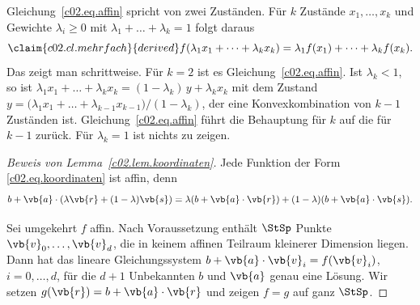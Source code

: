 \begin{vertiefung}[id=c02.v1,
    titel={Warum affine Funktionen diese Form haben},
    wozu={Der Kern benutzt Lemma~\ref{c02.lem.koordinaten} ohne Beweis. Hier steht er,
      zusammen mit der Regel für Mischungen aus mehr als zwei Zuständen.},
    voraussetzung={Kern bis Lemma~\ref{c02.lem.koordinaten}; lineare Gleichungssysteme.
      Der Rest des Kerns braucht diesen Block nicht.},
    zurueck={Auf einem Zustandsraum im $\mathbb{R}^d$ ist ein Effekt durch $d+1$ Zahlen
      festgelegt: $b$ und die Komponenten von $\vb{a}$.}]
  Gleichung~\eqref{c02.eq.affin} spricht von zwei Zuständen. Für $k$ Zustände
  $x_1, \dots, x_k$ und Gewichte $\lambda_i \geq 0$ mit $\lambda_1 + \dots + \lambda_k = 1$
  folgt daraus
  \begin{equation}\label{c02.eq.mehrfach}\claim{c02.cl.mehrfach}{derived}
    f(\lambda_1 x_1 + \dots + \lambda_k x_k) = \lambda_1 f(x_1) + \dots + \lambda_k f(x_k) .
  \end{equation}
  Das zeigt man schrittweise. Für $k = 2$ ist es Gleichung~\eqref{c02.eq.affin}. Ist
  $\lambda_k < 1$, so ist
  $\lambda_1 x_1 + \dots + \lambda_k x_k = (1-\lambda_k)\, y + \lambda_k x_k$ mit dem Zustand
  $y = \bigl(\lambda_1 x_1 + \dots + \lambda_{k-1} x_{k-1}\bigr)/(1-\lambda_k)$, der eine
  Konvexkombination von $k-1$ Zuständen ist. Gleichung~\eqref{c02.eq.affin} führt die
  Behauptung für $k$ auf die für $k-1$ zurück. Für $\lambda_k = 1$ ist nichts zu zeigen.

  \begin{proof}[Beweis von Lemma~\ref{c02.lem.koordinaten}]
    Jede Funktion der Form \eqref{c02.eq.koordinaten} ist affin, denn
    \begin{equation*}
      b + \vb{a}\cdot(\lambda\vb{r} + (1-\lambda)\vb{s})
      = \lambda(b + \vb{a}\cdot\vb{r}) + (1-\lambda)(b + \vb{a}\cdot\vb{s}) .
    \end{equation*}

    Sei umgekehrt $f$ affin. Nach Voraussetzung enthält $\StSp$ Punkte
    $\vb{v}_0, \dots, \vb{v}_d$, die in keinem affinen Teilraum kleinerer Dimension liegen.
    Dann hat das lineare Gleichungssystem $b + \vb{a}\cdot\vb{v}_i = f(\vb{v}_i)$,
    $i = 0, \dots, d$, für die $d+1$ Unbekannten $b$ und $\vb{a}$ genau eine Lösung. Wir
    setzen $g(\vb{r}) = b + \vb{a}\cdot\vb{r}$ und zeigen $f = g$ auf ganz $\StSp$.


\end{proof}
\end{vertiefung}
